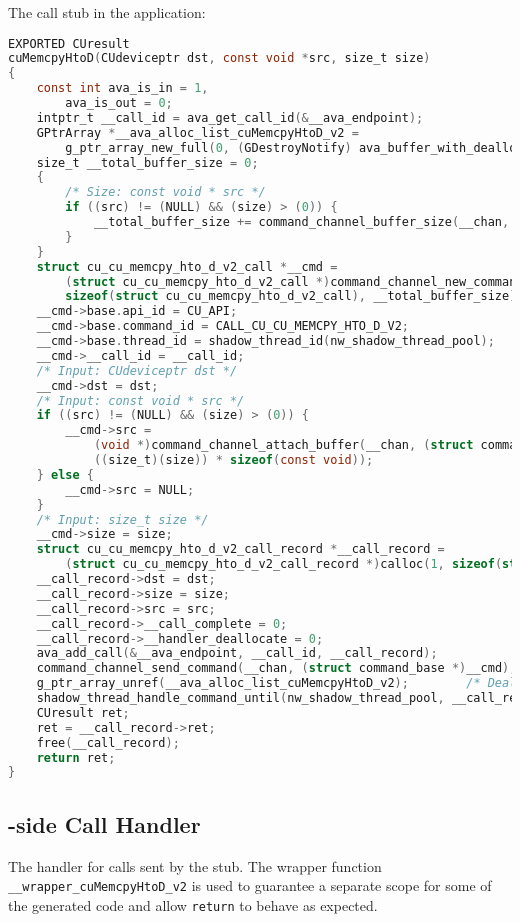 The call stub in the application:

\begin{lstlisting}[language=C,columns=flexible]
EXPORTED CUresult
cuMemcpyHtoD(CUdeviceptr dst, const void *src, size_t size)
{
    const int ava_is_in = 1,
        ava_is_out = 0;
    intptr_t __call_id = ava_get_call_id(&__ava_endpoint);
    GPtrArray *__ava_alloc_list_cuMemcpyHtoD_v2 =
        g_ptr_array_new_full(0, (GDestroyNotify) ava_buffer_with_deallocator_free);
    size_t __total_buffer_size = 0;
    {
        /* Size: const void * src */
        if ((src) != (NULL) && (size) > (0)) {
            __total_buffer_size += command_channel_buffer_size(__chan, ((size_t)(size)) * sizeof(const void));
        }
    }
    struct cu_cu_memcpy_hto_d_v2_call *__cmd =
        (struct cu_cu_memcpy_hto_d_v2_call *)command_channel_new_command(__chan,
        sizeof(struct cu_cu_memcpy_hto_d_v2_call), __total_buffer_size);
    __cmd->base.api_id = CU_API;
    __cmd->base.command_id = CALL_CU_CU_MEMCPY_HTO_D_V2;
    __cmd->base.thread_id = shadow_thread_id(nw_shadow_thread_pool);
    __cmd->__call_id = __call_id;
    /* Input: CUdeviceptr dst */
    __cmd->dst = dst;
    /* Input: const void * src */
    if ((src) != (NULL) && (size) > (0)) {
        __cmd->src =
            (void *)command_channel_attach_buffer(__chan, (struct command_base *)__cmd, src,
            ((size_t)(size)) * sizeof(const void));
    } else {
        __cmd->src = NULL;
    }
    /* Input: size_t size */
    __cmd->size = size;
    struct cu_cu_memcpy_hto_d_v2_call_record *__call_record =
        (struct cu_cu_memcpy_hto_d_v2_call_record *)calloc(1, sizeof(struct cu_cu_memcpy_hto_d_v2_call_record));
    __call_record->dst = dst;
    __call_record->size = size;
    __call_record->src = src;
    __call_record->__call_complete = 0;
    __call_record->__handler_deallocate = 0;
    ava_add_call(&__ava_endpoint, __call_id, __call_record);
    command_channel_send_command(__chan, (struct command_base *)__cmd);
    g_ptr_array_unref(__ava_alloc_list_cuMemcpyHtoD_v2);        /* Deallocate all memory in the alloc list */
    shadow_thread_handle_command_until(nw_shadow_thread_pool, __call_record->__call_complete);
    CUresult ret;
    ret = __call_record->ret;
    free(__call_record);
    return ret;
}
\end{lstlisting}

\subsection{\Worker-side Call Handler}
The \worker handler for calls sent by the stub.
The wrapper function \lstinline|__wrapper_cuMemcpyHtoD_v2| is used to guarantee a separate scope for some of the generated code and allow \lstinline|return| to behave as expected.

